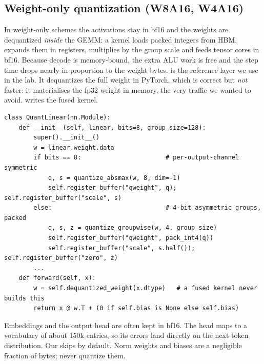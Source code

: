 \subsection{Weight-only quantization (W8A16, W4A16)}
In weight-only schemes the activations stay in bf16 and the weights are dequantized
\emph{inside} the GEMM: a kernel loads packed integers from HBM, expands them in
registers, multiplies by the group scale and feeds tensor cores in bf16. Because decode
is memory-bound, the extra ALU work is free and the step time drops nearly in proportion
to the weight bytes.  is the reference layer we use in
the lab. It dequantizes the full weight in PyTorch, which is correct but \emph{not}
faster: it materialises the fp32 weight in memory, the very traffic we wanted to avoid.
 writes the fused kernel.

\begin{lstlisting}[caption={A weight-only quantized linear layer (reference semantics,
not a fast kernel).},label={lst:efficient:quantlinear}]
class QuantLinear(nn.Module):
    def __init__(self, linear, bits=8, group_size=128):
        super().__init__()
        w = linear.weight.data
        if bits == 8:                       # per-output-channel symmetric
            q, s = quantize_absmax(w, 8, dim=-1)
            self.register_buffer("qweight", q); self.register_buffer("scale", s)
        else:                               # 4-bit asymmetric groups, packed
            q, s, z = quantize_groupwise(w, 4, group_size)
            self.register_buffer("qweight", pack_int4(q))
            self.register_buffer("scale", s.half()); self.register_buffer("zero", z)
        ...
    def forward(self, x):
        w = self.dequantized_weight(x.dtype)   # a fused kernel never builds this
        return x @ w.T + (0 if self.bias is None else self.bias)
\end{lstlisting}

\begin{pitfall}
Embeddings and the output head are often kept in bf16. The head maps to a vocabulary of
about 150k entries, so its errors land directly on the next-token distribution. Our
 skips  by default. Norm weights and biases are a
negligible fraction of bytes; never quantize them.
\end{pitfall}

